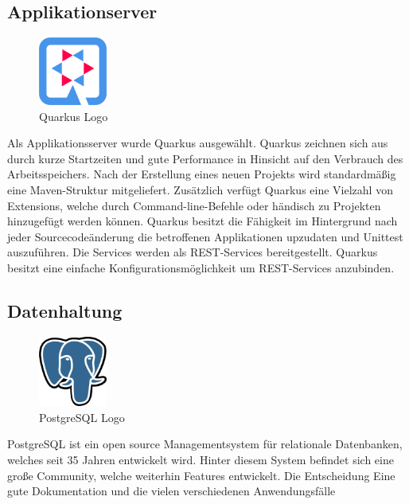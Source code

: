 \subsection{Applikationserver}
\begin{figure}
    \begin{center}
      \includegraphics[width=0.2\textwidth]{pics/quarkus_logo.png}
     \caption{Quarkus Logo}
    \end{center}
  \end{figure}
Als Applikationsserver wurde Quarkus ausgewählt. Quarkus zeichnen sich aus durch kurze Startzeiten und gute Performance in Hinsicht auf den Verbrauch des Arbeitsspeichers. Nach der Erstellung eines neuen Projekts wird standardmäßig eine Maven-Struktur mitgeliefert. Zusätzlich verfügt Quarkus eine Vielzahl von Extensions, welche durch Command-line-Befehle oder händisch zu Projekten hinzugefügt werden können. \cite{QuarkusAbout, QuarkusFirstApplication}
Quarkus besitzt die Fähigkeit im Hintergrund nach jeder Sourcecodeänderung die betroffenen Applikationen upzudaten und Unittest auszuführen.
Die Services werden als REST-Services bereitgestellt. Quarkus besitzt eine einfache Konfigurationsmöglichkeit um REST-Services anzubinden. 

\subsection{Datenhaltung}
\begin{figure}
    \begin{center}
      \includegraphics[width=0.2\textwidth]{pics/postgres_logo.png}
     \caption{PostgreSQL Logo}
    \end{center}
  \end{figure}
PostgreSQL ist ein open source Managementsystem für relationale Datenbanken, welches seit 35 Jahren entwickelt wird. Hinter diesem System befindet sich eine große Community, welche weiterhin Features entwickelt. Die Entscheidung Eine gute Dokumentation und die vielen verschiedenen Anwendungsfälle \cite{PostgreSQLAbout}






